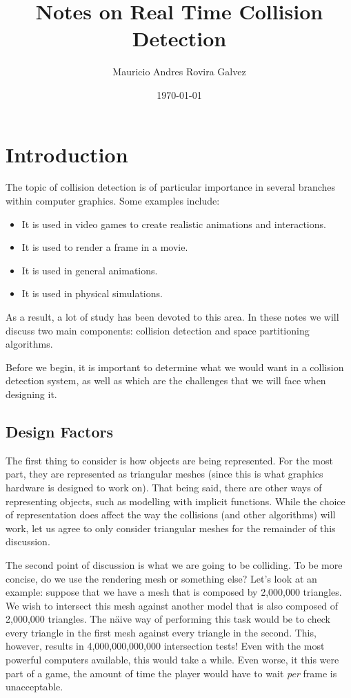 \documentclass[11pt, letterpaper, oneside]{article}
\title{Notes on Real Time Collision Detection}
\author{Mauricio Andres Rovira Galvez}
\date{\today}
\begin{document}
  \maketitle

  \section{Introduction}
    The topic of collision detection is of particular importance in several
    branches within computer graphics. Some examples include:
    \begin{itemize}
      \item It is used in video games to create realistic animations and 
        interactions.
      \item It is used to render a frame in a movie.
      \item It is used in general animations.
      \item It is used in physical simulations.
    \end{itemize}

    As a result, a lot of study has been devoted to this area. In these notes we
    will discuss two main components: collision detection and space partitioning
    algorithms.

    Before we begin, it is important to determine what we would want in a
    collision detection system, as well as which are the challenges that we will
    face when designing it.

      \subsection{Design Factors}
        The first thing to consider is how objects are being represented. For
        the most part, they are represented as triangular meshes (since this is
        what graphics hardware is designed to work on). That being said, there
        are other ways of representing objects, such as modelling with implicit
        functions. While the choice of representation does affect the way the
        collisions (and other algorithms) will work, let us agree to only
        consider triangular meshes for the remainder of this discussion.

        The second point of discussion is what we are going to be colliding. To
        be more concise, do we use the rendering mesh or something else?
        Let's look at an example: suppose that we have a mesh that is composed
        by 2,000,000 triangles. We wish to intersect this mesh against another
        model that is also composed of 2,000,000 triangles. The n\"aive way of
        performing this task would be to check every triangle in the first mesh
        against every triangle in the second. This, however, results in
        4,000,000,000,000 intersection tests! Even with the most powerful
        computers available, this would take a while. Even worse, it this were
        part of a game, the amount of time the player would have to wait
        \emph{per} frame is unacceptable. 
\end{document}
